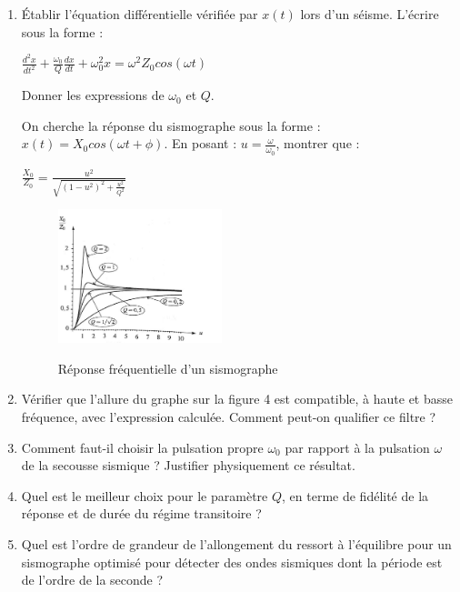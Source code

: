 \documentclass{article}
\begin{document}
\begin{enumerate}
    \item Établir l’équation différentielle vérifiée par $x(t)$ lors d’un séisme. L’écrire sous la forme : 

        
\begin{center}

   $ 
        \frac{d^2 x }{dt^2} + \frac{\omega _0}{Q} \frac{dx}{dt} + \omega _0 ^2 x = \omega ^2 Z_0 cos(\omega t)$
    
\end{center}


Donner les expressions de  $\omega _0$ et $Q$. 

        

On cherche la réponse du sismographe sous la forme : $x(t) = X_0 cos(\omega t + \phi)$. En posant :
$u=\frac{\omega}{\omega _0}$, montrer que : 




\begin{center}

   $ 
       \frac{X_0}{Z_0}=\frac{u^2}{\sqrt{(1-u^2)^2 + \frac{u^2}{Q^2}}}$
    
\end{center}

\begin{figure}[h]
  \centering
  \includegraphics[width=0.45\textwidth]{courbes.jpg}
  \label{fig:maison}
    \caption{Réponse fréquentielle d'un sismographe}
\end{figure}


\item Vérifier que l’allure du graphe sur la figure 4 est compatible, à haute et basse fréquence, avec l’expression calculée. Comment peut-on qualifier ce filtre ? 

\item Comment faut-il choisir la pulsation propre $\omega _0$ par rapport à la pulsation $\omega$ de la secousse
sismique ? Justifier physiquement ce résultat. 

\item Quel est le meilleur choix pour le paramètre $Q$, en terme de fidélité de la réponse et de
durée du régime transitoire ? 
\item Quel est l'ordre de grandeur de l'allongement du ressort à l'équilibre pour un sismographe optimisé pour détecter des ondes sismiques dont la période est de l'ordre de la seconde ? 


\end{enumerate}
\end{document}
